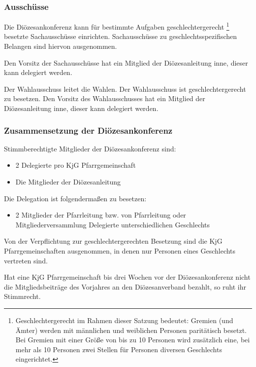 \documentclass[12pt]{report}
\newcommand{\footnoteremember}[2]{%
  \footnote{#2}
  \newcounter{#1}
  \setcounter{#1}{\value{footnote}}
}
\newcommand{\footnoterecall}[1]{%
  \footnotemark[\value{#1}]
}
\begin{document}
\begin{justify}
\subsubsection{Ausschüsse}
Die Diözesankonferenz kann für bestimmte Aufgaben
geschlechtergerecht\footnoteremember{geschlechtergerecht2}{Geschlechtergerecht im Rahmen dieser
  Satzung bedeutet: Gremien (und Ämter) werden mit männlichen und
  weiblichen Personen paritätisch besetzt. Bei Gremien mit einer Größe von bis zu 10 Personen
  wird zusätzlich eine, bei mehr als 10 Personen zwei Stellen für Personen diversen
  Geschlechts eingerichtet.} besetzte Sachausschüsse einrichten.
Sachausschüsse zu geschlechtsspezifischen Belangen sind hiervon ausgenommen.

Den Vorsitz der Sachausschüsse hat ein Mitglied der Diözesanleitung inne, dieser kann delegiert
werden.

Der Wahlausschuss leitet die Wahlen. Der Wahlausschuss ist geschlechtergerecht\footnoterecall{geschlechtergerecht2} zu besetzen. Den Vorsitz
des Wahlausschusses hat ein Mitglied der Diözesanleitung inne, dieser kann delegiert werden.

\subsubsection{Zusammensetzung der Diözesankonferenz}
Stimmberechtigte Mitglieder der Diözesankonferenz sind:
\begin{itemize}
  \item 2 Delegierte pro KjG Pfarrgemeinschaft
  \item Die Mitglieder der Diözesanleitung
\end{itemize}

Die Delegation ist folgendermaßen zu besetzen:
\begin{itemize}
  \item{ 2 Mitglieder der Pfarrleitung bzw. von Pfarrleitung oder Mitgliederversammlung
        Delegierte unterschiedlichen Geschlechts}
\end{itemize}

Von der Verpflichtung zur geschlechtergerechten\footnoterecall{geschlechtergerecht2} Besetzung
sind die KjG Pfarrgemeinschaften ausgenommen,
in denen nur Personen eines Geschlechts vertreten sind.

Hat eine KjG Pfarrgemeinschaft bis drei Wochen vor der Diözesankonferenz nicht
die Mitgliedsbeiträge des Vorjahres an den Diözesanverband bezahlt, so ruht ihr
Stimmrecht.\\


\end{justify}
\end{document}
